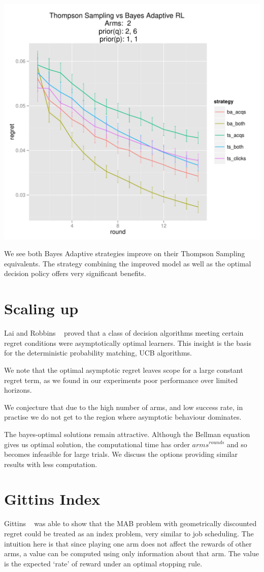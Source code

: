 \documentclass[12pt]{article}
\begin{document}
\includegraphics[scale=0.9]{TSvsBARL.pdf}

We see both Bayes Adaptive strategies improve on their Thompson Sampling equivalents. The strategy combining the improved model as well as the optimal decision policy offers very significant benefits.


\section{Scaling up}
Lai and Robbins ~\cite{lai1985asymptotically} proved that a class of decision algorithms meeting certain regret conditions were asymptotically optimal learners. This insight is the basis for the deterministic probability matching, UCB algorithms. 

We note that the optimal asymptotic regret leaves scope for a large constant regret term, as we found in our experiments poor performance over limited horizons.

We conjecture that due to the high number of arms, and low success rate, in practise we do not get to the region where asymptotic behaviour dominates.

The bayes-optimal solutions remain attractive. Although the Bellman equation gives us optimal solution, the computational time has order ${arms}^{rounds}$ and so becomes infeasible for large trials. We discuss the options providing similar results with less computation.
\section{Gittins Index}
Gittins ~\cite{gittins1979bandit} was able to show that the MAB problem with geometrically discounted regret could be treated as an index problem, very similar to job scheduling. The intuition here is that since playing one arm does not affect the rewards of other arms, a value can be computed using only information about that arm. The value is the expected ‘rate’ of reward under an optimal stopping rule.
\end{document}
